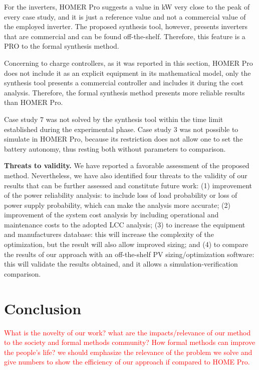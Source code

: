 \documentclass[runningheads]{llncs}
\begin{document}
For the inverters, HOMER Pro suggests a value in kW very close to the peak of every case study, and it is just a reference value and not a commercial value of the employed inverter. The proposed synthesis tool, however, presents inverters that are commercial and can be found off-the-shelf. Therefore, this feature is a PRO to the formal synthesis method.

Concerning to charge controllers, as it was reported in this section, HOMER Pro does not include it as an explicit equipment in its mathematical model, only the synthesis tool presents a commercial controller and includes it during the cost analysis. Therefore, the formal synthesis method presents more reliable results than HOMER Pro.

Case study $7$ was not solved by the synthesis tool within the time limit established during the experimental phase. Case study $3$ was not possible to simulate in HOMER Pro, because its restriction does not allow one to set the battery autonomy, thus resting both without parameters to comparison.

\noindent \textbf{Threats to validity.} We have reported a favorable assessment of the proposed method. Nevertheless, we have also identified four threats to the validity of our results that can be further assessed and constitute future work: (1) improvement of the power reliability analysis: to include loss of load probability or loss of power supply probability, which can make the analysis more accurate; (2) improvement of the system cost analysis by including operational and maintenance costs to the adopted LCC analysis; (3) to increase the equipment and manufacturers database: this will increase the complexity of the optimization, but the result will also allow improved sizing; and (4) to compare the results of our approach with an off-the-shelf PV sizing/optimization software: this will validate the results obtained, and it allows a simulation-verification comparison.

\section{Conclusion} 

\textcolor{red}{What is the novelty of our work? what are the impacts/relevance of our method to the society and formal methods community? How formal methods can improve the people's life? we should emphasize the relevance of the problem we solve and give numbers to show the efficiency of our approach if compared to HOME Pro.}
\end{document}
